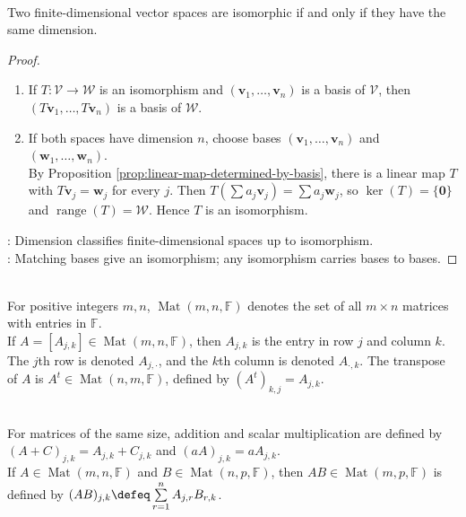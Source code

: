 \begin{theorem} \label{thm:finite-dimensional-isomorphic-iff-same-dimension} \\
Two finite-dimensional vector spaces are isomorphic if and only if they have the same dimension.
\begin{proof}
\begin{enumerate}[label=\roman*.]
\setlength{\itemsep}{0pt}
\item[$(\Rightarrow)$] If $T:\mathcal{V}\to\mathcal{W}$ is an isomorphism and $(\mathbf{v}_1,\ldots,\mathbf{v}_n)$ is a basis of $\mathcal{V}$, then $(T\mathbf{v}_1,\ldots,T\mathbf{v}_n)$ is a basis of $\mathcal{W}$.
\item[$(\Leftarrow)$] If both spaces have dimension $n$, choose bases $(\mathbf{v}_1,\ldots,\mathbf{v}_n)$ and $(\mathbf{w}_1,\ldots,\mathbf{w}_n)$.\\
By Proposition \ref{prop:linear-map-determined-by-basis}, there is a linear map $T$ with $T\mathbf{v}_j=\mathbf{w}_j$ for every $j$. Then $T(\sum a_j\mathbf{v}_j)=\sum a_j\mathbf{w}_j$, so $\ker(T)=\{\mathbf{0}\}$ and $\operatorname{range}(T)=\mathcal{W}$. Hence $T$ is an isomorphism.
\end{enumerate}
: Dimension classifies finite-dimensional spaces up to isomorphism.\\
: Matching bases give an isomorphism; any isomorphism carries bases to bases.
\end{proof}
\end{theorem}

\begin{definition} \\
For positive integers $m,n$, $\operatorname{Mat}(m,n,\mathbb{F})$ denotes the set of all $m\times n$ matrices with entries in $\mathbb{F}$.\\
If $A=[A_{j,k}]\in\operatorname{Mat}(m,n,\mathbb{F})$, then $A_{j,k}$ is the entry in row $j$ and column $k$. The $j$th row is denoted $A_{j,\cdot}$, and the $k$th column is denoted $A_{\cdot,k}$. The transpose of $A$ is $A^t\in\operatorname{Mat}(n,m,\mathbb{F})$, defined by $(A^t)_{k,j}=A_{j,k}$.
\end{definition}

\begin{definition} \\
For matrices of the same size, addition and scalar multiplication are defined by $(A+C)_{j,k}=A_{j,k}+C_{j,k}$ and $(aA)_{j,k}=aA_{j,k}$.\\
If $A\in\operatorname{Mat}(m,n,\mathbb{F})$ and $B\in\operatorname{Mat}(n,p,\mathbb{F})$, then $AB\in\operatorname{Mat}(m,p,\mathbb{F})$ is defined by $(AB)_{j,k}\defeq\sum\limits_{r=1}^n A_{j,r}B_{r,k}$.
\end{definition}

